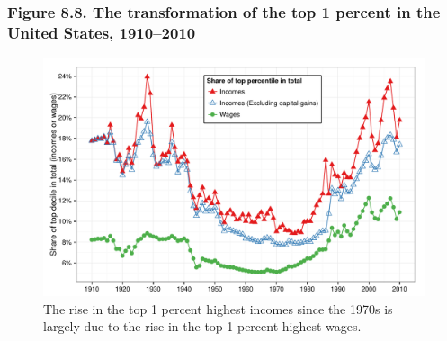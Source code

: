 \documentclass[t]{beamer}\usepackage[]{graphicx}\usepackage[]{color}
\newenvironment{knitrout}{}{} %
\begin{document}
\begin{frame}[label=Figure_8_8,fragile]
\frametitle{Figure 8.8. The transformation of the top 1 percent in the United States, 1910--2010}
\begin{figure}[t]
\begin{minipage}[b]{\textwidth}
\centering %
\begin{knitrout}\footnotesize
{}\color{fgcolor}

{\centering \includegraphics[width=1\linewidth]{figures/color/Figure_8_8} 

}



\end{knitrout}
\caption{The rise in the top 1 percent highest incomes since the 1970s is largely due to the rise in the top 1 percent highest wages.}
\end{minipage}
\end{figure}
\end{frame}
\end{document}
